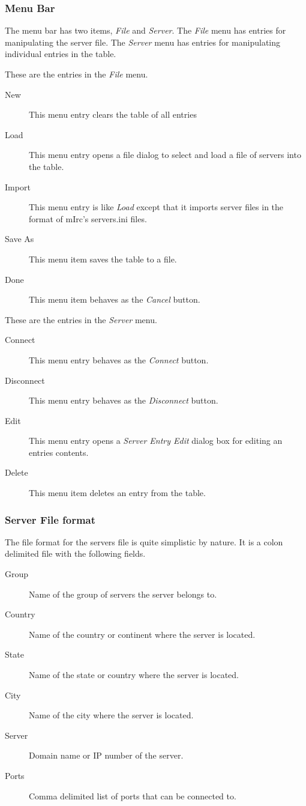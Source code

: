 \documentclass[titlepage]{article}
\begin{document}
\subsubsection{Menu Bar}
The menu bar has two items, \emph{File} and \emph{Server}. The \emph{File}
menu has entries for manipulating the server file. The \emph{Server} menu
has entries for manipulating individual entries in the table.

These are the entries in the \emph{File} menu.
\begin{description}
\item[New] This menu entry clears the table of all entries
\item[Load] This menu entry opens a file dialog to select and load a file
of servers into the table.
\item[Import] This menu entry is like \emph{Load} except that it imports
server files in the format of mIrc's servers.ini files.
\item[Save As] This menu item saves the table to a file.
\item[Done] This menu item behaves as the \emph{Cancel} button.
\end{description}

These are the entries in the \emph{Server} menu.
\begin{description}
\item[Connect] This menu entry behaves as the \emph{Connect} button.
\item[Disconnect] This menu entry behaves as the \emph{Disconnect} button.
\item[Edit] This menu entry opens a \emph{Server Entry Edit} dialog box for
editing an entries contents.
\item[Delete] This menu item deletes an entry from the table.
\end{description}

\subsubsection{Server File format}
The file format for the servers file is quite simplistic by nature. It is a
colon delimited file with the following fields.

\begin{description}
\item[Group] Name of the group of servers the server belongs to.
\item[Country] Name of the country or continent where the server is located.
\item[State] Name of the state or country where the server is located.
\item[City] Name of the city where the server is located.
\item[Server] Domain name or IP number of the server.
\item[Ports] Comma delimited list of ports that can be connected to.
\end{description}
\end{document}

